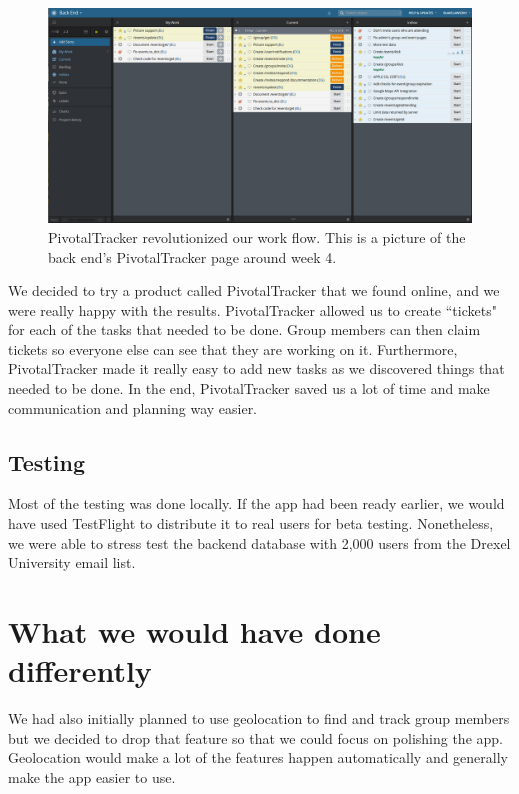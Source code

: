 \documentclass[12pt]{article}
\begin{document}
\begin{figure}
    \centering
    \includegraphics[scale=0.3]{pivotaltracker.png}
    \caption{
        PivotalTracker revolutionized our work flow. 
        This is a picture of the back end's PivotalTracker page around week 4.
    }
    \label{fig:pivotaltracker}
\end{figure}

We decided to try a product called PivotalTracker that we found online,
and we were really happy with the results.
PivotalTracker allowed us to create ``tickets" for each of the tasks that needed to be done.
Group members can then claim tickets so everyone else can see that they are working on it.
Furthermore, PivotalTracker made it really easy to add new tasks as we discovered things that needed to be done.
In the end, PivotalTracker saved us a lot of time and make communication and planning way easier.

\subsection{Testing}

Most of the testing was done locally. If the app had been ready earlier, we would have used TestFlight to distribute it to real users for beta testing. Nonetheless, we were able to stress test the backend database with 2,000 users from the Drexel University email list.

\bigskip
\section{What we would have done differently}

We had also initially planned to use geolocation to find and track group members but we decided to drop that feature so that we could focus on polishing the app. 
Geolocation would make a lot of the features happen automatically and generally make the app easier to use. 
\end{document}
